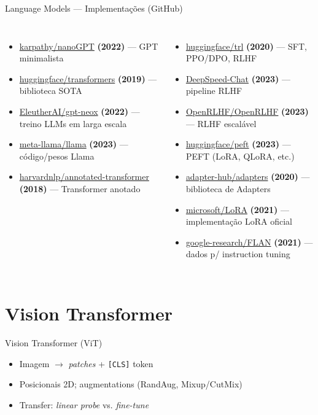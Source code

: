 \documentclass{beamer}
\begin{document}
\begin{frame}{Language Models — Implementações (GitHub)}
\scriptsize
\begin{columns}[t]
  \begin{itemize}
    \item \href{https://github.com/karpathy/nanoGPT}{karpathy/nanoGPT} \textbf{(2022)} — GPT minimalista
    \item \href{https://github.com/huggingface/transformers}{huggingface/transformers} \textbf{(2019)} — biblioteca SOTA
    \item \href{https://github.com/EleutherAI/gpt-neox}{EleutherAI/gpt-neox} \textbf{(2022)} — treino LLMs em larga escala
    \item \href{https://github.com/meta-llama/llama}{meta-llama/llama} \textbf{(2023)} — código/pesos Llama
    \item \href{https://github.com/harvardnlp/annotated-transformer}{harvardnlp/annotated-transformer} \textbf{(2018)} — Transformer anotado
  \end{itemize}

  \begin{itemize}
    \item \href{https://github.com/huggingface/trl}{huggingface/trl} \textbf{(2020)} — SFT, PPO/DPO, RLHF
    \item \href{https://github.com/deepspeedai/DeepSpeedExamples/tree/master/applications/DeepSpeed-Chat}{DeepSpeed-Chat} \textbf{(2023)} — pipeline RLHF
    \item \href{https://github.com/OpenRLHF/OpenRLHF}{OpenRLHF/OpenRLHF} \textbf{(2023)} — RLHF escalável
    \item \href{https://github.com/huggingface/peft}{huggingface/peft} \textbf{(2023)} — PEFT (LoRA, QLoRA, etc.)
    \item \href{https://github.com/adapter-hub/adapters}{adapter-hub/adapters} \textbf{(2020)} — biblioteca de Adapters
    \item \href{https://github.com/microsoft/LoRA}{microsoft/LoRA} \textbf{(2021)} — implementação LoRA oficial
    \item \href{https://github.com/google-research/FLAN}{google-research/FLAN} \textbf{(2021)} — dados p/ instruction tuning
  \end{itemize}
\end{columns}
\end{frame}




\section{Vision Transformer}
\begin{frame}{Vision Transformer (ViT)}
	\begin{itemize}
		\item Imagem $\rightarrow$ \textit{patches} + \texttt{[CLS]} token
		\item Posicionais 2D; augmentations (RandAug, Mixup/CutMix)
		\item Transfer: \textit{linear probe} vs. \textit{fine-tune}
	\end{itemize}
\end{frame}
\end{document}
